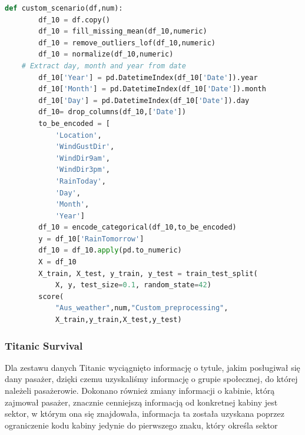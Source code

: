 \documentclass{book}
\begin{document}
\begin{lstlisting}[language=Python, caption={Indywidualny 
    scenariusz dla zestawu danych Aus Weather}, captionpos=b]
    def custom_scenario(df,num):
        df_10 = df.copy()
        df_10 = fill_missing_mean(df_10,numeric)
        df_10 = remove_outliers_lof(df_10,numeric)
        df_10 = normalize(df_10,numeric)
    # Extract day, month and year from date
        df_10['Year'] = pd.DatetimeIndex(df_10['Date']).year
        df_10['Month'] = pd.DatetimeIndex(df_10['Date']).month
        df_10['Day'] = pd.DatetimeIndex(df_10['Date']).day
        df_10= drop_columns(df_10,['Date'])
        to_be_encoded = [
            'Location',
            'WindGustDir',
            'WindDir9am',
            'WindDir3pm',
            'RainToday',
            'Day',
            'Month',
            'Year']
        df_10 = encode_categorical(df_10,to_be_encoded)
        y = df_10['RainTomorrow']
        df_10 = df_10.apply(pd.to_numeric)
        X = df_10
        X_train, X_test, y_train, y_test = train_test_split(
            X, y, test_size=0.1, random_state=42)
        score(
            "Aus_weather",num,"Custom_preprocessing",
            X_train,y_train,X_test,y_test)
\end{lstlisting}

\subsubsection{Titanic Survival}
Dla zestawu danych Titanic wyciągnięto informację o tytule, 
jakim posługiwał się dany pasażer, dzięki czemu uzyskaliśmy 
informację o grupie społecznej, do której należeli pasażerowie. 
Dokonano również zmiany informacji o kabinie, którą zajmował pasażer, 
znacznie cenniejszą informacją od konkretnej kabiny jest sektor, 
w którym ona się znajdowała, informacja ta została uzyskana poprzez 
ograniczenie kodu kabiny jedynie do pierwszego znaku, który 
określa sektor
\end{document}
